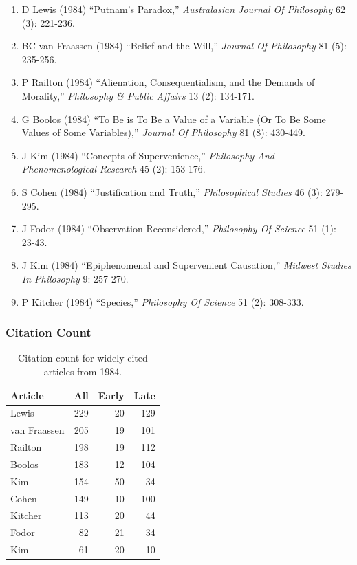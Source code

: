 \documentclass[
  10pt,
  letterpaper,
  DIV=11,
  numbers=noendperiod,
  twoside]{scrartcl}
\providecommand{\tightlist}{%
  \setlength{\itemsep}{0pt}\setlength{\parskip}{0pt}}\usepackage{longtable,booktabs,array}
\begin{document}
\begin{enumerate}
\def\labelenumi{\arabic{enumi}.}
\tightlist
\item
  D Lewis (1984) ``Putnam's Paradox,'' \emph{Australasian Journal Of
  Philosophy} 62 (3): 221-236.
\item
  BC van Fraassen (1984) ``Belief and the Will,'' \emph{Journal Of
  Philosophy} 81 (5): 235-256.
\item
  P Railton (1984) ``Alienation, Consequentialism, and the Demands of
  Morality,'' \emph{Philosophy \& Public Affairs} 13 (2): 134-171.
\item
  G Boolos (1984) ``To Be is To Be a Value of a Variable (Or To Be Some
  Values of Some Variables),'' \emph{Journal Of Philosophy} 81 (8):
  430-449.
\item
  J Kim (1984) ``Concepts of Supervenience,'' \emph{Philosophy And
  Phenomenological Research} 45 (2): 153-176.
\item
  S Cohen (1984) ``Justification and Truth,'' \emph{Philosophical
  Studies} 46 (3): 279-295.
\item
  J Fodor (1984) ``Observation Reconsidered,'' \emph{Philosophy Of
  Science} 51 (1): 23-43.
\item
  J Kim (1984) ``Epiphenomenal and Supervenient Causation,''
  \emph{Midwest Studies In Philosophy} 9: 257-270.
\item
  P Kitcher (1984) ``Species,'' \emph{Philosophy Of Science} 51 (2):
  308-333.
\end{enumerate}

\subsubsection*{Citation Count}\label{sec-count-1984}

\begin{longtable}[]{@{}lrrr@{}}

\caption{\label{tbl-citation-count-1984}Citation count for widely cited
articles from 1984.}

\tabularnewline

\toprule\noalign{}
Article & All & Early & Late \\
\midrule\noalign{}
\endhead
\bottomrule\noalign{}
\endlastfoot
Lewis & 229 & 20 & 129 \\
van Fraassen & 205 & 19 & 101 \\
Railton & 198 & 19 & 112 \\
Boolos & 183 & 12 & 104 \\
Kim & 154 & 50 & 34 \\
Cohen & 149 & 10 & 100 \\
Kitcher & 113 & 20 & 44 \\
Fodor & 82 & 21 & 34 \\
Kim & 61 & 20 & 10 \\

\end{longtable}
\end{document}
